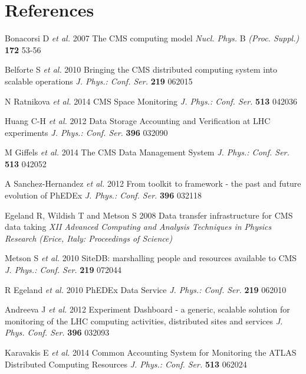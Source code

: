 \section*{References}

\begin{thebibliography}{1}

 Bonacorsi D {\it et al.} 2007 The CMS computing model 
{\it Nucl. Phys.} B {\it (Proc. Suppl.)} {\bf 172} 53-56

 Belforte S {\it et al.} 2010 Bringing the CMS distributed computing system into scalable operations 
{\it J. Phys.: Conf. Ser.} {\bf 219} 062015

N Ratnikova {\it et al.} 2014 CMS Space Monitoring {\it J. Phys.: Conf. Ser.} {\bf 513} 042036 

Huang C-H {\it et al.} 2012 Data Storage Accounting and Verification at LHC experiments 
{\it J. Phys.: Conf. Ser.} {\bf 396} 032090

M Giffels {\it et al.} 2014 The CMS Data Management System {\it J. Phys.: Conf. Ser.} {\bf 513} 042052

A Sanchez-Hernandez {\it et al.} 2012 From toolkit to framework - the past and future evolution of PhEDEx  
{\it J. Phys.: Conf. Ser.} {\bf 396} 032118 

Egeland R, Wildish T and Metson S 2008 Data transfer infrastructure for CMS data taking 
{\it XII Advanced Computing and Analysis Techniques in Physics Research (Erice, Italy: Proceedings of Science)}


Metson S {\it et al.} 2010 SiteDB: marshalling people and resources available to CMS
{\it J. Phys.: Conf. Ser.} {\bf 219} 072044


 R Egeland {\it et al.} 2010  PhEDEx Data Service 
{\it J. Phys.: Conf. Ser.} {\bf 219} 062010

  Andreeva J {\it et al.} 2012 Experiment Dashboard - a generic, scalable solution for 
monitoring of the LHC computing activities, distributed sites and services 
{\it J. Phys. Conf. Ser.} {\bf 396} 032093


Karavakis E {\it et al.}  2014 Common Accounting System for Monitoring the ATLAS 
Distributed Computing Resources
{\it J. Phys.: Conf. Ser.} {\bf 513} 062024


\end{thebibliography}
